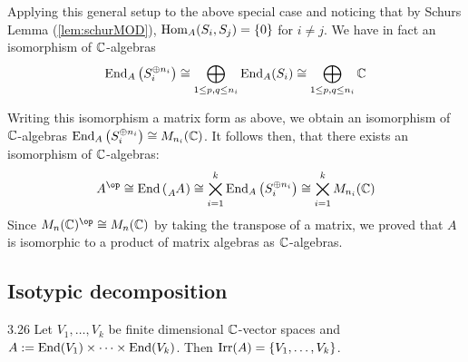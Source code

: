 \documentclass[twoside = false,	%
		headsepline,		%
		parskip = true,
		]{scrbook}						%
\begin{document}
        Applying this general setup to the above special case and noticing that by Schurs Lemma (\ref{lem:schurMOD}), $\mathrm{Hom}_A(S_i,S_j) = \{0\}$ for $i \neq j$. We have in fact an isomorphism of $\mathbb C$-algebras
        \begin{equation*}
            \mathrm{End}_A\left( S_i^{\oplus n_i}\right) \cong \bigoplus_{1 \leq p,q \leq n_i} \mathrm{End}_A(S_i) \cong \bigoplus_{1 \leq p,q \leq n_i} \mathbb C
        \end{equation*}

        Writing this isomorphism a matrix form as above, we obtain an isomorphism of $\mathbb C$-algebras $\mathrm{End}_A\left( S_i^{\oplus n_i}\right) \cong M_{n_i}(\mathbb C)$. It follows then, that there exists an isomorphism of $\mathbb C$-algebras:
        \begin{equation*}
        \begin{split}
            A^\op \cong \End\round{\tensor[_A]{A}{}} \cong \bigtimes_{i=1}^k \End_A\round{S_i^{\oplus n_i}} \cong \bigtimes_{i=1}^k M_{n_i}(\C)
        \end{split}
        \end{equation*}
        Since $M_n(\C)^\op \cong M_n(\C)$ by taking the transpose of a matrix, we proved that $A$ is isomorphic to a product of matrix algebras as $\mathbb C$-algebras.
        
    \subsection{Isotypic decomposition}

    
        \begin{proposition}{}{3.26}
            Let $V_1,\dots,V_k$ be finite dimensional $\mathbb C$-vector spaces and $A:=\mathrm{End}(V_1) \times \dots \times \mathrm{End}(V_k)$. Then $\mathrm{Irr}(A) = \{V_1,\dots,V_k\}$.
        \end{proposition}
\end{document}
